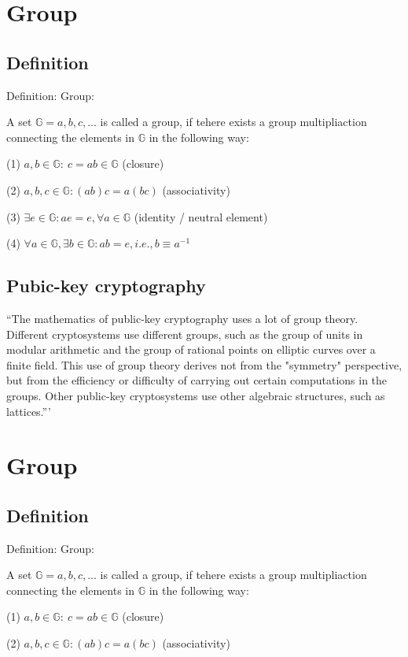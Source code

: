 \documentclass[twocolumn]{article}
\begin{document}
\section{Group}
\subsection{Definition}
Definition: Group\cite{Cardelli:1996:TS:234313.234418}:

A set $\mathbb{G}={a, b, c, ...}$ is called a group, if tehere exists a group multipliaction connecting the elements in $\mathbb{G}$ in the following way:

(1) $a, b \in \mathbb{G}:\ c=a b \in \mathbb{G}$ (closure)

(2) $a, b, c \in \mathbb{G}: (ab)c=a(bc)$ (associativity)

(3) $\exists e \in \mathbb{G}: ae=e, \forall a \in \mathbb{G}$ (identity / neutral element)

(4) $\forall a \in \mathbb{G}, \exists b \in \mathbb{G}: ab=e, i.e., b\equiv a^{-1}$

\subsection{Pubic-key cryptography}
``The mathematics of public-key cryptography uses a lot of group theory. Different cryptosystems use different groups, such as the group of units in modular arithmetic and the group of rational points on elliptic curves over a finite field. This use of group theory derives not from the "symmetry" perspective, but from the efficiency or difficulty of carrying out certain computations in the groups. Other public-key cryptosystems use other algebraic structures, such as lattices.''' \cite{Cardelli:1996:TS:234313.234418}
\section{Group}
\subsection{Definition}
Definition: Group\cite{Cardelli:1996:TS:234313.234418}:

A set $\mathbb{G}={a, b, c, ...}$ is called a group, if tehere exists a group multipliaction connecting the elements in $\mathbb{G}$ in the following way:

(1) $a, b \in \mathbb{G}:\ c=a b \in \mathbb{G}$ (closure)

(2) $a, b, c \in \mathbb{G}: (ab)c=a(bc)$ (associativity)
\end{document}
